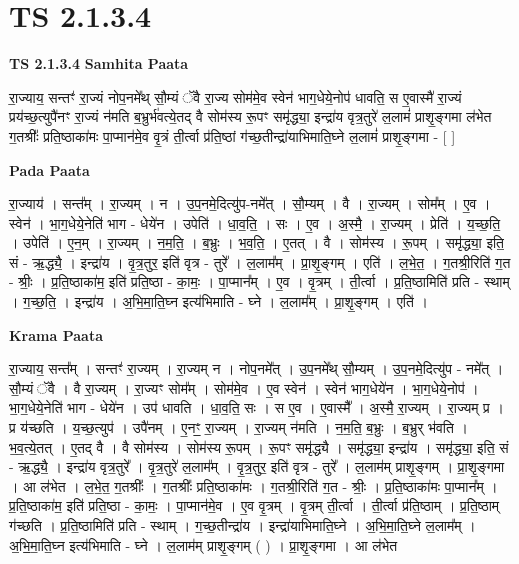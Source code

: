 \documentclass[17pt]{extarticle}
\begin{document}
\section*{ TS 2.1.3.4 }

\textbf{TS 2.1.3.4 } \newline
\textbf{Samhita Paata} \newline

रा॒ज्याय॒ सन्तꣳ॑ रा॒ज्यं नोप॒नमे᳚थ् सौ॒म्यं ॅवै रा॒ज्य सोम॑मे॒व स्वेन॑ भाग॒धेये॒नोप॑ धावति॒ स ए॒वास्मै॑ रा॒ज्यं प्रय॑च्छ॒त्युपै॑नꣳ रा॒ज्यं न॑मति ब॒भ्रुर्भ॑वत्ये॒तद् वै सोम॑स्य रू॒पꣳ समृ॑द्ध्या॒ इन्द्रा॑य वृत्र॒तुरे॑ ल॒लामं॑ प्राशृ॒ङ्गमा ल॑भेत ग॒तश्रीः᳚ प्रति॒ष्ठाका॑मः पा॒प्मान॑मे॒व वृ॒त्रं ती॒र्त्वा प्र॑ति॒ष्ठां ग॑च्छ॒तीन्द्रा॑याभिमाति॒घ्ने ल॒लामं॑ प्राशृ॒ङ्गमा - [  ] \newline

\textbf{Pada Paata} \newline

रा॒ज्याय॑ । सन्त᳚म् । रा॒ज्यम् । न । उ॒प॒नमे॒दित्यु॑प-नमे᳚त् । सौ॒म्यम् । वै । रा॒ज्यम् । सोम᳚म् । ए॒व । स्वेन॑ । भा॒ग॒धेये॒नेति॑ भाग - धेये॑न । उपेति॑ । धा॒व॒ति॒ । सः । ए॒व । अ॒स्मै॒ । रा॒ज्यम् । प्रेति॑ । य॒च्छ॒ति॒ । उपेति॑ । ए॒न॒म् । रा॒ज्यम् । न॒म॒ति॒ । ब॒भ्रुः । भ॒व॒ति॒ । ए॒तत् । वै । सोम॑स्य । रू॒पम् । समृ॑द्ध्या॒ इति॒ सं - ऋ॒द्ध्यै॒ । इन्द्रा॑य । वृ॒त्र॒तुर॒ इति॑ वृत्र - तुरे᳚ । ल॒लाम᳚म् । प्रा॒शृ॒ङ्गम् । एति॑ । ल॒भे॒त॒ । ग॒तश्री॒रिति॑ ग॒त - श्रीः॒ । प्र॒ति॒ष्ठाका॑म॒ इति॑ प्रति॒ष्ठा - का॒मः॒ । पा॒प्मान᳚म् । ए॒व । वृ॒त्रम् । ती॒र्त्वा । प्र॒ति॒ष्ठामिति॑ प्रति - स्थाम् । ग॒च्छ॒ति॒ । इन्द्रा॑य । अ॒भि॒मा॒ति॒घ्न इत्य॑भिमाति - घ्ने । ल॒लाम᳚म् । प्रा॒शृ॒ङ्गम् । एति॑ ।  \newline


\textbf{Krama Paata} \newline

रा॒ज्याय॒ सन्त᳚म् । सन्तꣳ॑ रा॒ज्यम् । रा॒ज्यम् न । नोप॒नमे᳚त् । उ॒प॒नमे᳚थ् सौ॒म्यम् । उ॒प॒नमे॒दित्यु॑प - नमे᳚त् । सौ॒म्यं ॅवै । वै रा॒ज्यम् । रा॒ज्यꣳ सोम᳚म् । सोम॑मे॒व । ए॒व स्वेन॑ । स्वेन॑ भाग॒धेये॑न । भा॒ग॒धेये॒नोप॑ । भा॒ग॒धेये॒नेति॑ भाग - धेये॑न । उप॑ धावति । धा॒व॒ति॒ सः । स ए॒व । ए॒वास्मै᳚ । अ॒स्मै॒ रा॒ज्यम् । रा॒ज्यम् प्र । प्र य॑च्छति । य॒च्छ॒त्युप॑ । उपै॑नम् । ए॒नꣳ॒॒ रा॒ज्यम् । रा॒ज्यम् न॑मति । न॒म॒ति॒ ब॒भ्रुः । ब॒भ्रुर् भ॑वति । भ॒व॒त्ये॒तत् । ए॒तद् वै । वै सोम॑स्य । सोम॑स्य रू॒पम् । रू॒पꣳ समृ॑द्ध्यै । समृ॑द्ध्या॒ इन्द्रा॑य । समृ॑द्ध्या॒ इति॒ सं - ऋ॒द्ध्यै॒ । इन्द्रा॑य वृत्र॒तुरे᳚ । वृ॒त्र॒तुरे॑ ल॒लाम᳚म् । वृ॒त्र॒तुर॒ इति॑ वृत्र - तुरे᳚ । ल॒लाम॑म् प्राशृ॒ङ्गम् । प्रा॒शृ॒ङ्गमा । आ ल॑भेत । ल॒भे॒त॒ ग॒तश्रीः᳚ । ग॒तश्रीः᳚ प्रति॒ष्ठाका॑मः । ग॒तश्री॒रिति॑ ग॒त - श्रीः॒ । प्र॒ति॒ष्ठाका॑मः पा॒प्मान᳚म् । प्र॒ति॒ष्ठाका॑म॒ इति॑ प्रति॒ष्ठा - का॒मः॒ । पा॒प्मान॑मे॒व । ए॒व वृ॒त्रम् । वृ॒त्रम् ती॒र्त्वा । ती॒र्त्वा प्र॑ति॒ष्ठाम् । प्र॒ति॒ष्ठाम् ग॑च्छति । प्र॒ति॒ष्ठामिति॑ प्रति - स्थाम् । ग॒च्छ॒तीन्द्रा॑य । इन्द्रा॑याभिमाति॒घ्ने । अ॒भि॒मा॒ति॒घ्ने ल॒लाम᳚म् । अ॒भि॒॒मा॒ति॒घ्न इत्य॑भिमाति - घ्ने । ल॒लाम॑म् प्राशृ॒ङ्गम् ( ) । प्रा॒शृ॒ङ्गमा । आ ल॑भेत \newline
\end{document}
